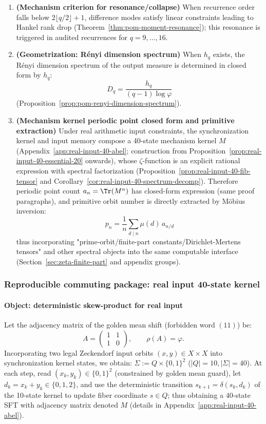 \begin{theorem}
\begin{enumerate}
  \item \textbf{(Mechanism criterion for resonance/collapse)} When recurrence order falls below $2\lfloor q/2\rfloor+1$, difference modes satisfy linear constraints leading to Hankel rank drop (Theorem~\ref{thm:pom-moment-resonance}); this resonance is triggered in audited recurrences for $q=9,\dots,16$.
  \item \textbf{(Geometrization: Rényi dimension spectrum)} When $h_q$ exists, the Rényi dimension spectrum of the output measure is determined in closed form by $h_q$:
  \[
  D_q=\frac{h_q}{(q-1)\log\varphi}
  \]
  (Proposition~\ref{prop:pom-renyi-dimension-spectrum}).
  \item \textbf{(Mechanism kernel periodic point closed form and primitive extraction)} Under real arithmetic input constraints, the synchronization kernel and input memory compose a 40-state mechanism kernel $M$ (Appendix~\ref{app:real-input-40-abel}; construction from Proposition~\ref{prop:real-input-40-essential-20} onwards), whose $\zeta$-function is an explicit rational expression with spectral factorization (Proposition~\ref{prop:real-input-40-fib-tensor} and Corollary~\ref{cor:real-input-40-spectrum-decomp}). Therefore periodic point count $a_n=\Tr(M^n)$ has closed-form expression (same proof paragraphs), and primitive orbit number is directly extracted by Möbius inversion:
  \[
  p_n=\frac{1}{n}\sum_{d\mid n}\mu(d)\,a_{n/d}
  \]
  thus incorporating "prime-orbit/finite-part constants/Dirichlet-Mertens tensors" and other spectral objects into the same computable interface (Section~\ref{sec:zeta-finite-part} and appendix groups).
\end{enumerate}
\end{theorem}

\subsubsection{Reproducible commuting package: real input 40-state kernel}\label{subsec:real-input-40-commuting-package}
\paragraph{Object: deterministic skew-product for real input}
Let the adjacency matrix of the golden mean shift (forbidden word $(11)$) be:
\[
A=\begin{pmatrix}1&1\\[2pt]1&0\end{pmatrix},\qquad \rho(A)=\varphi.
\]
Incorporating two legal Zeckendorf input orbits $(x,y)\in X\times X$ into synchronization kernel states, we obtain:
\(
\Sigma:=Q\times\{0,1\}^2
\)
($|Q|=10,|\Sigma|=40$).
At each step, read $(x_k,y_k)\in\{0,1\}^2$ (constrained by golden mean guard), let $d_k=x_k+y_k\in\{0,1,2\}$,
and use the deterministic transition $s_{k+1}=\delta(s_k,d_k)$ of the 10-state kernel to update fiber coordinate $s\in Q$;
thus obtaining a $40$-state SFT with adjacency matrix denoted $M$ (details in Appendix~\ref{app:real-input-40-abel}).

